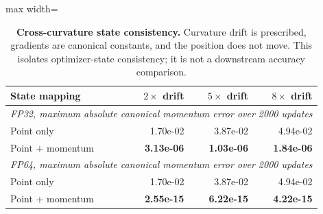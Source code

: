 \begin{table}[t]
\centering
\caption{\textbf{Cross-curvature state consistency.} Curvature drift is prescribed, gradients are canonical constants, and the position does not move. This isolates optimizer-state consistency; it is not a downstream accuracy comparison.}
\label{tab:operator-transport}
\footnotesize\setlength{\tabcolsep}{4.2pt}\renewcommand{\arraystretch}{1.12}
\begin{adjustbox}{max width=\linewidth}
\begin{tabular}{lrrr}
\toprule
State mapping & $2\times$ drift & $5\times$ drift & $8\times$ drift \\
\midrule
\multicolumn{4}{l}{\textit{FP32, maximum absolute canonical momentum error over 2000 updates}} \\
Point only & 1.70e-02 & 3.87e-02 & 4.94e-02 \\
\rowcolor{oursbg}
Point + momentum & \textbf{3.13e-06} & \textbf{1.03e-06} & \textbf{1.84e-06} \\
\multicolumn{4}{l}{\textit{FP64, maximum absolute canonical momentum error over 2000 updates}} \\
Point only & 1.70e-02 & 3.87e-02 & 4.94e-02 \\
\rowcolor{oursbg}
Point + momentum & \textbf{2.55e-15} & \textbf{6.22e-15} & \textbf{4.22e-15} \\
\bottomrule
\end{tabular}
\end{adjustbox}
\end{table}
